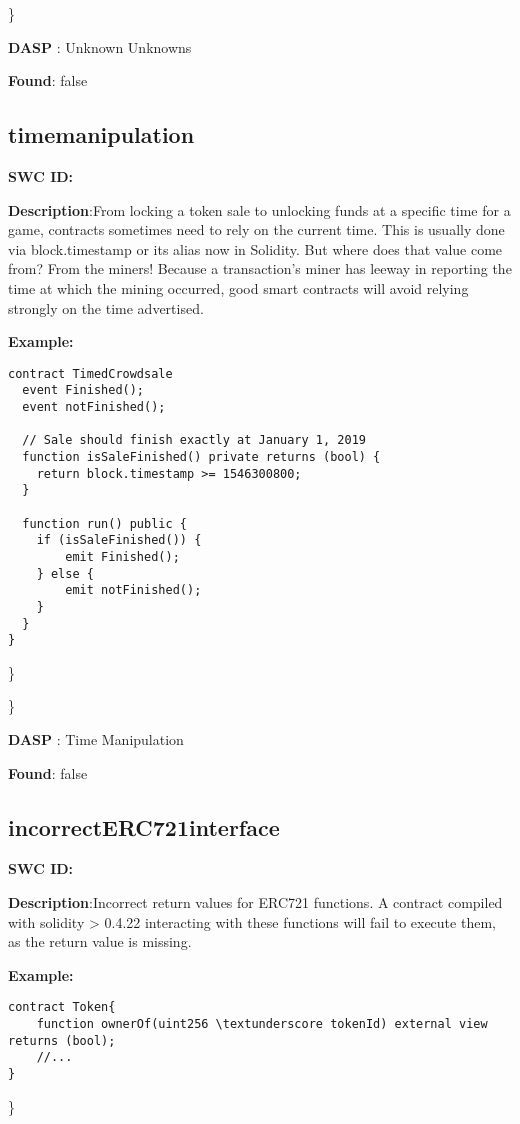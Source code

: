 \documentclass{article}
\begin{document}
\} 

\textbf{DASP} : Unknown Unknowns

\textbf{Found}: false

\subsection{time\textunderscore manipulation} 
\textbf{SWC \textunderscore ID:} 

\textbf{Description}:From locking a token sale to unlocking funds at a specific time for a game, contracts sometimes need to rely on the current time. This is usually done via block.timestamp or its alias now in Solidity. But where does that value come from? From the miners! Because a transaction's miner has leeway in reporting the time at which the mining occurred, good smart contracts will avoid relying strongly on the time advertised.


\textbf{Example:} 
\begin{verbatim}
contract TimedCrowdsale
  event Finished();
  event notFinished();

  // Sale should finish exactly at January 1, 2019
  function isSaleFinished() private returns (bool) {
    return block.timestamp >= 1546300800;
  }

  function run() public {
    if (isSaleFinished()) {
        emit Finished();
    } else {
        emit notFinished();
    }
  }
}

\end{verbatim}\} 

\} 

\textbf{DASP} : Time Manipulation

\textbf{Found}: false

\subsection{incorrect\textunderscore ERC721\textunderscore interface} 
\textbf{SWC \textunderscore ID:} 

\textbf{Description}:Incorrect return values for ERC721 functions. A contract compiled with solidity > 0.4.22 interacting with these functions will fail to execute them, as the return value is missing.


\textbf{Example:} 
\begin{verbatim}
contract Token{
    function ownerOf(uint256 \textunderscore tokenId) external view returns (bool);
    //...
}

\end{verbatim}\} 
\end{document}

